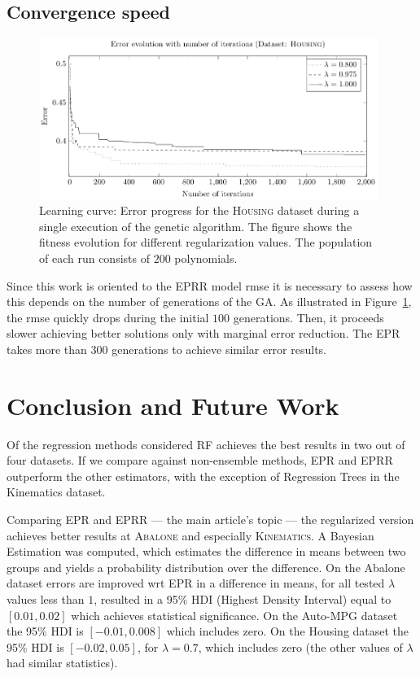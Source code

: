 \documentclass[review,preprint]{elsarticle}
\begin{document}
\subsection{Convergence speed}
%
\begin{figure}[tb]
	\begin{center}
		\includegraphics[width=0.98\textwidth]{Fig4xx.pdf}
		\caption{Learning curve: Error progress for the \textsc{Housing} dataset during a single execution of the genetic algorithm. The figure shows the fitness evolution for different regularization values. The population of each run consists of $200$ polynomials.}
		\label{Abalone_fitnessProgress}
	\end{center}
\end{figure}
%
Since this work is oriented to the \ac{EPRR} model \ac{rmse} it is necessary to assess how this depends on the number of generations of the \ac{GA}. As illustrated in Figure~\ref{Abalone_fitnessProgress}, the \ac{rmse} quickly drops during the initial $100$ generations. Then, it proceeds slower achieving better solutions only with marginal error reduction. The \ac{EPR} takes more than $300$ generations to achieve similar error results.

\section{Conclusion and Future Work}

Of the regression methods considered \ac{RF} achieves the best results in two out of four datasets. If we compare against non-ensemble methods, \ac{EPR} and \ac{EPRR} outperform the other estimators, with the exception of Regression Trees in the Kinematics dataset. 

Comparing \ac{EPR} and \ac{EPRR} --- the main article's topic --- the regularized version achieves better results at \textsc{Abalone} and especially \textsc{Kinematics}. A Bayesian Estimation was computed, which estimates the difference in means between two groups and yields a probability distribution over the difference. On the Abalone dataset errors are improved wrt EPR in a difference in means, for all tested $\lambda$ values less than $1$, resulted in a 95\% HDI (Highest Density Interval) equal to $\left\lbrack 0.01, 0.02 \right\rbrack$ which achieves statistical significance. On the Auto-MPG dataset the 95\% HDI is $\left\lbrack -0.01, 0.008 \right\rbrack$ which includes zero. On the Housing dataset the 95\% HDI is $\left\lbrack- 0.02, 0.05 \right\rbrack$, for $\lambda = 0.7$, which includes zero (the other values of $\lambda$ had similar statistics).
\end{document}

